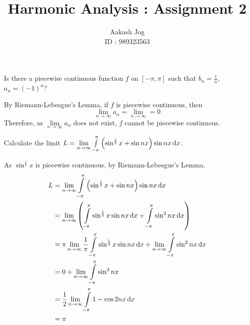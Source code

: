 \documentclass[fleqn, a4paper, 11pt, oneside]{amsart}
\title{Harmonic Analysis : Assignment 2}
\author
{
	Aakash Jog\\
	ID : 989323563
}
\date{\formatdate{10}{11}{2015}}
\theoremstyle{definition}
\theoremstyle{theorem}
\begin{document}

\maketitle

\begin{question}
	Is there a piecewise continuous function $f$ on $[-\pi,\pi]$ such that $b_n = \frac{1}{n}$, $a_n = (-1)^n$?
\end{question}

\begin{solution}
	By Riemann-Lebesgue's Lemma, if $f$ is piecewise continuous, then
	\begin{equation*}
		\lim\limits_{n \to \infty} a_n = \lim\limits_{n \to \infty} = 0
	\end{equation*}
	Therefore, as $\lim\limits_{n \to \infty} a_n$ does not exist, $f$ cannot be piecewise continuous.
\end{solution}

\begin{question}
	Calculate the limit $L = \lim\limits_{n \to \infty} \int\limits_{-\pi}^{\pi} \left( \sin^{\frac{1}{3}} x + \sin n x \right) \sin n x \dif x$.
\end{question}

\begin{solution}
	As $\sin^{\frac{1}{3}} x$ is piecewise continuous, by Riemann-Lebesgue's Lemma,
	\begin{align*}
		L & = \lim\limits_{n \to \infty} \int\limits_{-\pi}^{\pi} \left( \sin^{\frac{1}{3}} x + \sin n x \right) \sin n x \dif x                                                                 \\
                  & = \lim\limits_{n \to \infty} \left( \int\limits_{-\pi}^{\pi} \sin^{\frac{1}{3}} x \sin n x \dif x + \int\limits_{-\pi}^{\pi} \sin^2 n x \dif x \right)                               \\
                  & = \pi \lim\limits_{n \to \infty} \frac{1}{\pi} \int\limits_{-\pi}^{\pi} \sin^{\frac{1}{3}} x \sin n x \dif x + \lim\limits_{n \to \infty} \int\limits_{-\pi}^{\pi} \sin^2 n x \dif x \\
                  & = 0 + \lim\limits_{n \to \infty} \int\limits_{-\pi}^{\pi} \sin^2 n x                                                                                                                 \\
                  & = \frac{1}{2} \lim\limits_{n \to \infty} \int\limits_{-\pi}^{\pi} 1 - \cos 2 n x \dif x                                                                                              \\
                  & = \pi
	\end{align*}
\end{solution}
\end{document}

